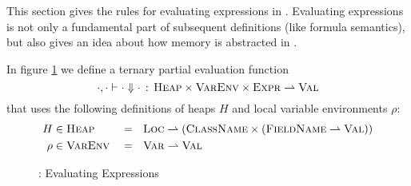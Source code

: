 This section gives the rules for evaluating expressions in \svlidf.
Evaluating expressions is not only a fundamental part of subsequent definitions (like formula semantics), but also gives an idea about how memory is abstracted in \svlidf.

In figure \ref{fig:eval-expr} we define a ternary partial evaluation function 
$$\cdot, \cdot \vdash \cdot \Downarrow \cdot \,:\, \textup{\textsc{Heap}} \times \textup{\textsc{VarEnv}} \times \textup{\textsc{Expr}} \rightharpoonup \textup{\textsc{Val}}$$
that uses the following definitions of heaps $H$ and local variable environments $\rho$:
\begin{align*}
	H    & \in \textup{\textsc{Heap}}   &  & =~~ \textup{\textsc{Loc}} \rightharpoonup (\textup{\textsc{ClassName}} \times (\textup{\textsc{FieldName}} \rightharpoonup \textup{\textsc{Val}})) \\
	\rho & \in \textup{\textsc{VarEnv}} &  & =~~ \textup{\textsc{Var}} \rightharpoonup \textup{\textsc{Val}}
\end{align*}

\begin{figure}
    
    \caption{\svlidf: Evaluating Expressions}
    \label{fig:eval-expr}
\end{figure}